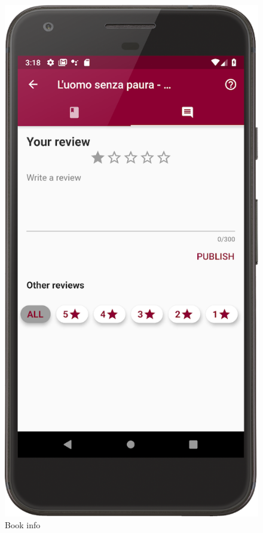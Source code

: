 \begin{figure}[!htb]
\begin{minipage}[b]{0.3\textwidth}
        \caption{Book info}
        \label{ref:bookinfo}
    \end{minipage}
    \hfill
    \begin{minipage}[b]{0.3\textwidth}
        \centering
        \includegraphics[scale=1]{images/no-review.png}

\end{minipage}
\end{figure}
